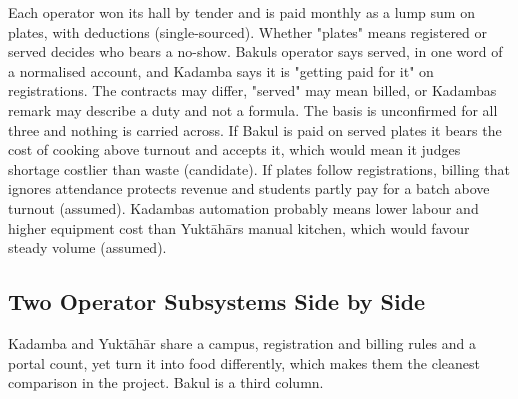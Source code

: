 \documentclass[
  10pt,
  table]{article}
\begin{document}
Each operator won its hall by tender and is paid monthly as a lump sum on plates, with deductions (single-sourced). Whether "plates" means registered or served decides who bears a no-show. Bakul\textquotesingle s operator says served, in one word of a normalised account, and Kadamba says it is "getting paid for it" on registrations. The contracts may differ, "served" may mean billed, or Kadamba\textquotesingle s remark may describe a duty and not a formula. The basis is unconfirmed for all three and nothing is carried across. If Bakul is paid on served plates it bears the cost of cooking above turnout and accepts it, which would mean it judges shortage costlier than waste (candidate). If plates follow registrations, billing that ignores attendance protects revenue and students partly pay for a batch above turnout (assumed). Kadamba\textquotesingle s automation probably means lower labour and higher equipment cost than Yuktāhār\textquotesingle s manual kitchen, which would favour steady volume (assumed).

\subsection{Two Operator Subsystems Side by Side}\label{two-operator-subsystems-side-by-side}

Kadamba and Yuktāhār share a campus, registration and billing rules and a portal count, yet turn it into food differently, which makes them the cleanest comparison in the project. Bakul is a third column.
\end{document}
